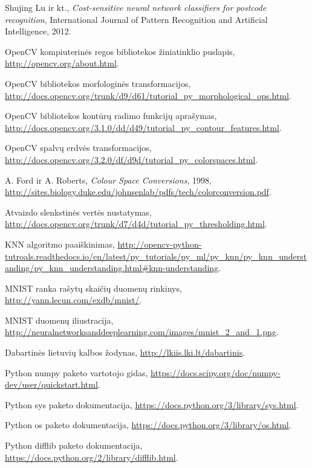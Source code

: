 \documentclass[a4paper,12pt]{article}
\begin{document}
\begin{thebibliography}{99}
 Shujing Lu ir kt., \textit{Cost-sensitive neural network classifiers for postcode recognition}, International Journal of Pattern Recognition and Artificial Intelligence, 2012.
 
OpenCV kompiuterinės regos bibliotekos žiniatinklio puslapis, \url{http://opencv.org/about.html}.

OpenCV bibliotekos morfologinės transformacijos, \url{http://docs.opencv.org/trunk/d9/d61/tutorial_py_morphological_ops.html}.

OpenCV bibliotekos kontūrų radimo funkcijų aprašymas, \url{http://docs.opencv.org/3.1.0/dd/d49/tutorial_py_contour_features.html}.

OpenCV spalvų erdvės transformacijos, \url{http://docs.opencv.org/3.2.0/df/d9d/tutorial_py_colorspaces.html}.

A. Ford ir A. Roberts, \textit{Colour Space Conversions}, 1998,
\url{http://sites.biology.duke.edu/johnsenlab/pdfs/tech/colorconversion.pdf}.

Atvaizdo slenkstinės vertės nustatymas, \url{http://docs.opencv.org/trunk/d7/d4d/tutorial_py_thresholding.html}.

KNN algoritmo paaiškinimas, \url{http://opencv-python-tutroals.readthedocs.io/en/latest/py_tutorials/py_ml/py_knn/py_knn_understanding/py_knn_understanding.html#knn-understanding}.

MNIST ranka rašytų skaičių duomenų rinkinys, \url{http://yann.lecun.com/exdb/mnist/}.

MNIST duomenų iliustracija, \url{http://neuralnetworksanddeeplearning.com/images/mnist_2_and_1.png}.

Dabartinės lietuvių kalbos žodynas, \url{http://lkiis.lki.lt/dabartinis}.

Python numpy paketo vartotojo gidas, \url{https://docs.scipy.org/doc/numpy-dev/user/quickstart.html}.

Python sys paketo dokumentacija, \url{https://docs.python.org/3/library/sys.html}.

Python os paketo dokumentacija, \url{https://docs.python.org/3/library/os.html}.

Python difflib paketo dokumentacija, \url{https://docs.python.org/2/library/difflib.html}.

\end{thebibliography} 
 
\end{document}
